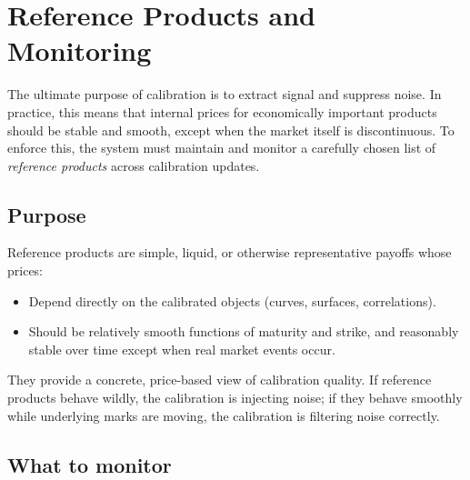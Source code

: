 \documentclass[11pt,a4paper]{article}
\begin{document}
\section{Reference Products and Monitoring}

The ultimate purpose of calibration is to extract signal and suppress noise. In practice, this means that internal prices for economically important products should be stable and smooth, except when the market itself is discontinuous. To enforce this, the system must maintain and monitor a carefully chosen list of \textit{reference products} across calibration updates.

\subsection{Purpose}

Reference products are simple, liquid, or otherwise representative payoffs whose prices:
\begin{itemize}
    \item Depend directly on the calibrated objects (curves, surfaces, correlations).
    \item Should be relatively smooth functions of maturity and strike, and reasonably stable over time except when real market events occur.
\end{itemize}

They provide a concrete, price-based view of calibration quality. If reference products behave wildly, the calibration is injecting noise; if they behave smoothly while underlying marks are moving, the calibration is filtering noise correctly.

\subsection{What to monitor}
\end{document}
